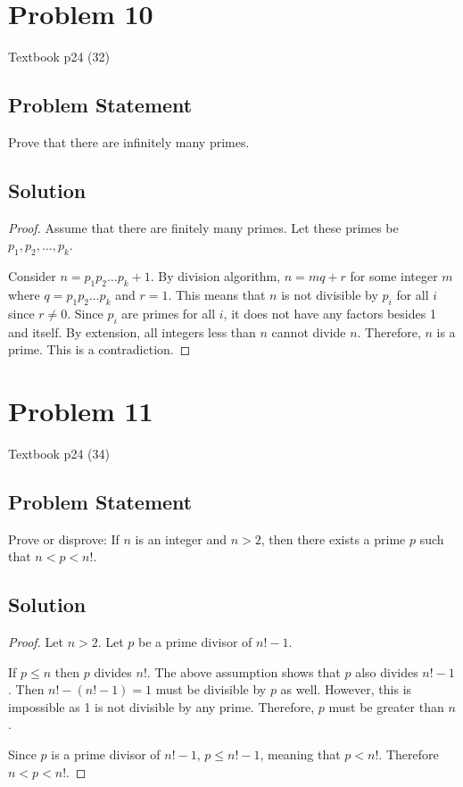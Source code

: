 \documentclass{article}
\begin{document}
\section*{Problem 10}

Textbook p24 (32)

\subsection*{Problem Statement}

Prove that there are infinitely many primes.

\subsection*{Solution}

\begin{proof}
	Assume that there are finitely many primes. Let these primes be \\ $p_1, p_2, \ldots, p_k$.

	Consider $n = p_1 p_2 \ldots p_k + 1$. By division algorithm, $n = mq + r$ for some integer $m$ where $q = p_1 p_2 \ldots p_k$ and $r = 1$. This means that $n$ is not divisible by $p_i$ for all $i$ since $r \neq 0$. Since $p_i$ are primes for all $i$, it does not have any factors besides 1 and itself. By extension, all integers less than $n$ cannot divide $n$. Therefore, $n$ is a prime. This is a contradiction.

\end{proof}

\section*{Problem 11}

Textbook p24 (34)

\subsection*{Problem Statement}

Prove or disprove: If $n$ is an integer and $n > 2$, then there exists a prime $p$ such
that $n < p < n!$.

\subsection*{Solution}

\begin{proof}
	Let $n > 2$. Let $p$ be a prime divisor of $n! - 1$.

	If $p \leq n$ then $p$ divides $n!$. The above assumption shows that $p$ also divides $n! - 1$. Then $n! - (n! - 1) = 1$ must be divisible by $p$ as well. However, this is impossible as 1 is not divisible by any prime. Therefore, $p$ must be greater than $n$.

	Since $p$ is a prime divisor of $n! - 1$, $p \leq n!- 1$, meaning that $p < n!$. Therefore $n < p < n!$.
\end{proof}
\end{document}
